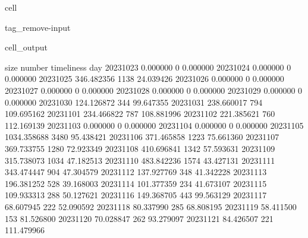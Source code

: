 \documentclass[letterpaper,10pt,english]{jupyterBook}
\begin{document}
\begin{sphinxuseclass}{cell}
\begin{sphinxuseclass}{tag_remove-input}\begin{sphinxVerbatimOutput}

\begin{sphinxuseclass}{cell_output}
\begin{sphinxVerbatim}[commandchars=\\\{\}]
                   size  number  timeliness
day                                        
2023\PYGZhy{}10\PYGZhy{}23     0.000000       0    0.000000
2023\PYGZhy{}10\PYGZhy{}24     0.000000       0    0.000000
2023\PYGZhy{}10\PYGZhy{}25   346.482356    1138   24.039426
2023\PYGZhy{}10\PYGZhy{}26     0.000000       0    0.000000
2023\PYGZhy{}10\PYGZhy{}27     0.000000       0    0.000000
2023\PYGZhy{}10\PYGZhy{}28     0.000000       0    0.000000
2023\PYGZhy{}10\PYGZhy{}29     0.000000       0    0.000000
2023\PYGZhy{}10\PYGZhy{}30   124.126872     344   99.647355
2023\PYGZhy{}10\PYGZhy{}31   238.660017     794  109.695162
2023\PYGZhy{}11\PYGZhy{}01   234.466822     787  108.881996
2023\PYGZhy{}11\PYGZhy{}02   221.385621     760  112.169139
2023\PYGZhy{}11\PYGZhy{}03     0.000000       0    0.000000
2023\PYGZhy{}11\PYGZhy{}04     0.000000       0    0.000000
2023\PYGZhy{}11\PYGZhy{}05  1034.358688    3480   95.438421
2023\PYGZhy{}11\PYGZhy{}06   371.465858    1223   75.661360
2023\PYGZhy{}11\PYGZhy{}07   369.733755    1280   72.923349
2023\PYGZhy{}11\PYGZhy{}08   410.696841    1342   57.593631
2023\PYGZhy{}11\PYGZhy{}09   315.738073    1034   47.182513
2023\PYGZhy{}11\PYGZhy{}10   483.842236    1574   43.427131
2023\PYGZhy{}11\PYGZhy{}11   343.474447     904   47.304579
2023\PYGZhy{}11\PYGZhy{}12   137.927769     348   41.342228
2023\PYGZhy{}11\PYGZhy{}13   196.381252     528   39.168003
2023\PYGZhy{}11\PYGZhy{}14   101.377359     234   41.673107
2023\PYGZhy{}11\PYGZhy{}15   109.933313     288   50.127621
2023\PYGZhy{}11\PYGZhy{}16   149.368705     443   99.563129
2023\PYGZhy{}11\PYGZhy{}17    68.607945     222   52.090592
2023\PYGZhy{}11\PYGZhy{}18    80.337990     285   68.808195
2023\PYGZhy{}11\PYGZhy{}19    58.411500     153   81.526800
2023\PYGZhy{}11\PYGZhy{}20    70.028847     262   93.279097
2023\PYGZhy{}11\PYGZhy{}21    84.426507     221  111.479966
\end{sphinxVerbatim}

\end{sphinxuseclass}\end{sphinxVerbatimOutput}

\end{sphinxuseclass}
\end{sphinxuseclass}
\sphinxstepscope
\end{document}
